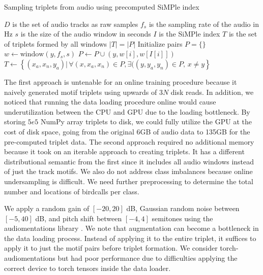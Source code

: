 \documentclass[
]{ceurart}
\begin{document}
\begin{algorithm}
    \caption{Sampling triplets from audio using precomputed SiMPle index}
    \begin{algorithmic}
        \Require $D$ is the set of audio tracks as raw samples
        \Require $f_s$ is the sampling rate of the audio in Hz
        \Require $s$ is the size of the audio window in seconds
        \Require $I$ is the SiMPle index
        \Ensure $T$ is the set of triplets formed by all windows
        \Ensure $|T| = |P|$
        \State Initialize pairs $P = \{\}$
            \State $w \gets \text{window}(y, f_s, s)$
                \State $P \gets P \cup (y, w[i], w[I[i]])$
            \EndFor
        \EndFor
        \State $T \gets \left\{
            (x_a, x_n, y_a) |
                \,
                \forall (x, x_a, x_n) \in P,
                \exists((y, y_a, y_n) \in P
                ,
                \, x \neq y
        \right\}$
    \end{algorithmic}
\end{algorithm}


The first approach is untenable for an online training procedure because it naively generated motif triplets using upwards of $3N$ disk reads. In addition, we noticed that running the data loading procedure online would cause underutilization between the CPU and GPU due to the loading bottleneck. By storing $5e5$ NumPy array triplets to disk, we could fully utilize the GPU at the cost of disk space, going from the original 6GB of audio data to 135GB for the pre-computed triplet data. The second approach required no additional memory because it took on an iterable approach to creating triplets. It has a different distributional semantic from the first since it includes all audio windows instead of just the track motifs. We also do not address class imbalances because online undersampling is difficult. We need further preprocessing to determine the total number and locations of birdcalls per class.

We apply a random gain of $[-20, 20]$ dB, Gaussian random noise between $[-5, 40]$ dB, and pitch shift between $[-4, 4]$ semitones using the audiomentations library \cite{audiomentations}. We note that augmentation can become a bottleneck in the data loading process. Instead of applying it to the entire triplet, it suffices to apply it to just the motif pairs before triplet formation. We consider torch-audiomentations but had poor performance due to difficulties applying the correct device to torch tensors inside the data loader.
\end{document}

